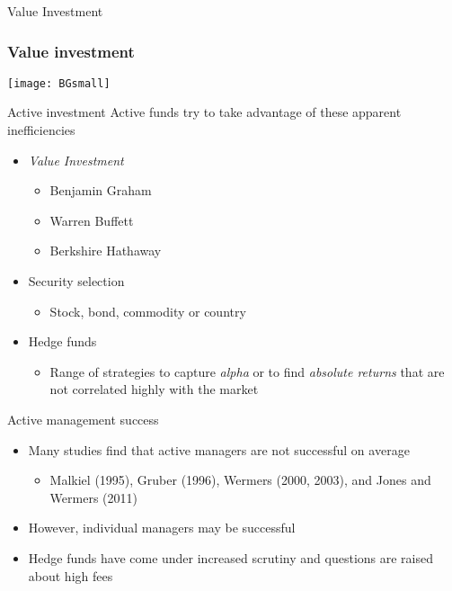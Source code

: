 \documentclass[14pt,xcolor=pdftex,dvipsnames,table]{beamer}\usepackage[]{graphicx}\usepackage[]{color}
\begin{document}
\begin{frame}{Value Investment}
\frametitle{Value investment}
\begin{center}
\texttt{[image: BGsmall]}
\end{center}
\end{frame}

\begin{frame}{Active investment}
Active funds try to take advantage of these apparent inefficiencies
\begin{itemize}[<+-| alert@+>]
\pause
\item \emph{Value Investment}
\begin{itemize}
\item Benjamin Graham
\item Warren Buffett
\item Berkshire Hathaway
\end{itemize}
\item Security selection
\begin{itemize}
\item Stock, bond, commodity or country
\end{itemize}
\item Hedge funds
\begin{itemize}
\item Range of strategies to capture \emph{alpha} or to find \emph{absolute returns} that are not correlated highly with the market 
\end{itemize}
\end{itemize}
\end{frame}

\begin{frame}{Active management success}
\begin{itemize}[<+-| alert@+>]
\pause
\item Many studies find that active managers are not successful on average
\begin{itemize}
\item Malkiel (1995), Gruber (1996), Wermers (2000, 2003), and Jones
and Wermers (2011)
\end{itemize}
\item However, individual managers may be successful
\item Hedge funds have come under increased scrutiny and questions are raised about high fees
\end{itemize}
\end{frame}
 
\end{document}
